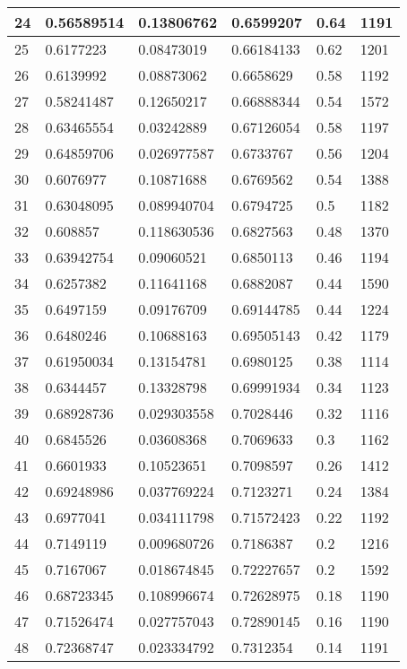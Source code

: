 \begin{longtable}{|l|l|l|l|l|l|}
24 & 0.56589514 & 0.13806762 & 0.6599207 & 0.64 & 1191 \\ \hline 
25 & 0.6177223 & 0.08473019 & 0.66184133 & 0.62 & 1201 \\ \hline 
26 & 0.6139992 & 0.08873062 & 0.6658629 & 0.58 & 1192 \\ \hline 
27 & 0.58241487 & 0.12650217 & 0.66888344 & 0.54 & 1572 \\ \hline 
28 & 0.63465554 & 0.03242889 & 0.67126054 & 0.58 & 1197 \\ \hline 
29 & 0.64859706 & 0.026977587 & 0.6733767 & 0.56 & 1204 \\ \hline 
30 & 0.6076977 & 0.10871688 & 0.6769562 & 0.54 & 1388 \\ \hline 
31 & 0.63048095 & 0.089940704 & 0.6794725 & 0.5 & 1182 \\ \hline 
32 & 0.608857 & 0.118630536 & 0.6827563 & 0.48 & 1370 \\ \hline 
33 & 0.63942754 & 0.09060521 & 0.6850113 & 0.46 & 1194 \\ \hline 
34 & 0.6257382 & 0.11641168 & 0.6882087 & 0.44 & 1590 \\ \hline 
35 & 0.6497159 & 0.09176709 & 0.69144785 & 0.44 & 1224 \\ \hline 
36 & 0.6480246 & 0.10688163 & 0.69505143 & 0.42 & 1179 \\ \hline 
37 & 0.61950034 & 0.13154781 & 0.6980125 & 0.38 & 1114 \\ \hline 
38 & 0.6344457 & 0.13328798 & 0.69991934 & 0.34 & 1123 \\ \hline 
39 & 0.68928736 & 0.029303558 & 0.7028446 & 0.32 & 1116 \\ \hline 
40 & 0.6845526 & 0.03608368 & 0.7069633 & 0.3 & 1162 \\ \hline 
41 & 0.6601933 & 0.10523651 & 0.7098597 & 0.26 & 1412 \\ \hline 
42 & 0.69248986 & 0.037769224 & 0.7123271 & 0.24 & 1384 \\ \hline 
43 & 0.6977041 & 0.034111798 & 0.71572423 & 0.22 & 1192 \\ \hline 
44 & 0.7149119 & 0.009680726 & 0.7186387 & 0.2 & 1216 \\ \hline 
45 & 0.7167067 & 0.018674845 & 0.72227657 & 0.2 & 1592 \\ \hline 
46 & 0.68723345 & 0.108996674 & 0.72628975 & 0.18 & 1190 \\ \hline 
47 & 0.71526474 & 0.027757043 & 0.72890145 & 0.16 & 1190 \\ \hline 
48 & 0.72368747 & 0.023334792 & 0.7312354 & 0.14 & 1191 \\ \hline 

\end{longtable}
